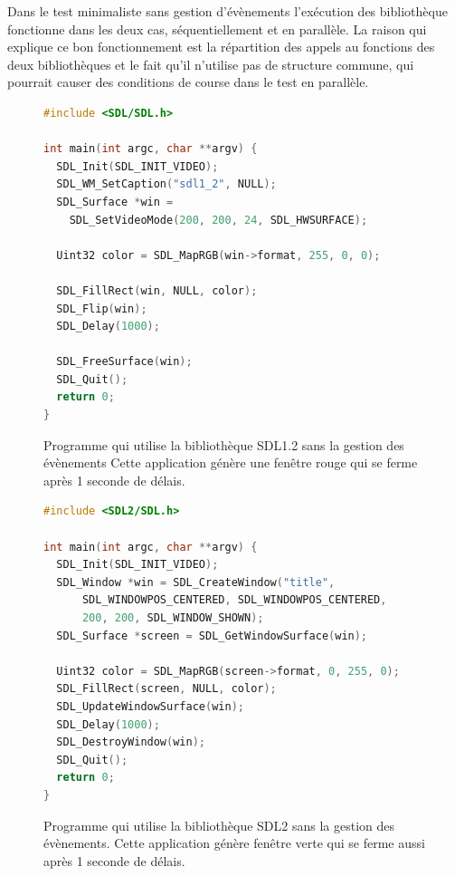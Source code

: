 
Dans le test minimaliste sans gestion d'évènements l'exécution des bibliothèque
fonctionne dans les deux cas, séquentiellement et en parallèle. La raison qui
explique ce bon fonctionnement est la répartition des appels au fonctions
des deux bibliothèques et le fait qu'il n'utilise pas de structure commune,
qui pourrait causer des conditions de course dans le test en parallèle.

\begin{center}
  \begin{figure}[ht]
\begin{lstlisting}[language=C,frame=single]
#include <SDL/SDL.h>

int main(int argc, char **argv) {
  SDL_Init(SDL_INIT_VIDEO);
  SDL_WM_SetCaption("sdl1_2", NULL);
  SDL_Surface *win =
    SDL_SetVideoMode(200, 200, 24, SDL_HWSURFACE);

  Uint32 color = SDL_MapRGB(win->format, 255, 0, 0);

  SDL_FillRect(win, NULL, color);
  SDL_Flip(win);
  SDL_Delay(1000);

  SDL_FreeSurface(win);
  SDL_Quit();
  return 0;
}
\end{lstlisting}
    \caption{Programme qui utilise la bibliothèque SDL1.2 sans la gestion des évènements
    Cette application génère une fenêtre rouge qui se ferme après 1 seconde de délais.}
  \end{figure}
\end{center}

\begin{center}
  \begin{figure}[ht]
\begin{lstlisting}[language=C,frame=single]
#include <SDL2/SDL.h>

int main(int argc, char **argv) {
  SDL_Init(SDL_INIT_VIDEO);
  SDL_Window *win = SDL_CreateWindow("title",
      SDL_WINDOWPOS_CENTERED, SDL_WINDOWPOS_CENTERED,
      200, 200, SDL_WINDOW_SHOWN);
  SDL_Surface *screen = SDL_GetWindowSurface(win);

  Uint32 color = SDL_MapRGB(screen->format, 0, 255, 0);
  SDL_FillRect(screen, NULL, color);
  SDL_UpdateWindowSurface(win);
  SDL_Delay(1000);
  SDL_DestroyWindow(win);
  SDL_Quit();
  return 0;
}
\end{lstlisting}
    \caption{Programme qui utilise la bibliothèque SDL2 sans la gestion des évènements.
    Cette application génère fenêtre verte qui se ferme aussi après 1 seconde de délais.}
  \end{figure}
\end{center}

